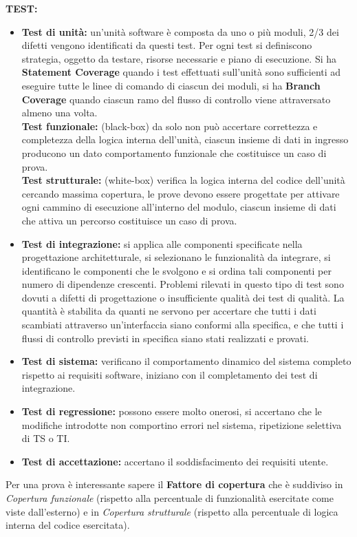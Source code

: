 \textbf{TEST:}
\begin{itemize}
	\item \textbf{Test di unità:} un'unità software è composta da uno o più moduli, 2/3 dei difetti vengono identificati da questi test. Per ogni test si definiscono strategia, oggetto da testare, risorse necessarie e piano di esecuzione. Si ha \textbf{Statement Coverage} quando i test effettuati sull'unità sono sufficienti ad eseguire tutte le linee di comando di ciascun dei moduli, si ha \textbf{Branch Coverage} quando ciascun ramo del flusso di controllo viene attraversato almeno una volta.\\
\textbf{Test funzionale:} (black-box) da solo non può accertare correttezza e completezza della logica interna dell'unità, ciascun insieme di dati in ingresso producono un dato comportamento funzionale che costituisce un caso di prova.\\
\textbf{Test strutturale:} (white-box) verifica la logica interna del codice dell'unità cercando massima copertura, le prove devono essere progettate per attivare ogni cammino di esecuzione all'interno del modulo, ciascun insieme di dati che attiva un percorso costituisce un caso di prova.
	\item \textbf{Test di integrazione:} si applica alle componenti specificate nella progettazione architetturale, si selezionano le funzionalità da integrare, si identificano le componenti che le svolgono e si ordina tali componenti per numero di dipendenze crescenti. Problemi rilevati in questo tipo di test sono dovuti a difetti di progettazione o insufficiente qualità dei test di qualità. La quantità è stabilita da quanti ne servono per accertare che tutti i dati scambiati attraverso un'interfaccia siano conformi alla specifica, e che tutti i flussi di controllo previsti in specifica siano stati realizzati e provati.
	\item \textbf{Test di sistema:} verificano il comportamento dinamico del sistema completo rispetto ai requisiti software, iniziano con il completamento dei test di integrazione.
	\item \textbf{Test di regressione:} possono essere molto onerosi, si accertano che le modifiche introdotte non comportino errori nel sistema, ripetizione selettiva di TS o TI.
	\item \textbf{Test di accettazione:} accertano il soddisfacimento dei requisiti utente.
\end{itemize}
Per una prova è interessante sapere il \textbf{Fattore di copertura} che è suddiviso in \textit{Copertura funzionale} (rispetto alla percentuale di funzionalità esercitate come viste dall'esterno) e in \textit{Copertura strutturale} (rispetto alla percentuale di logica interna del codice esercitata). 
